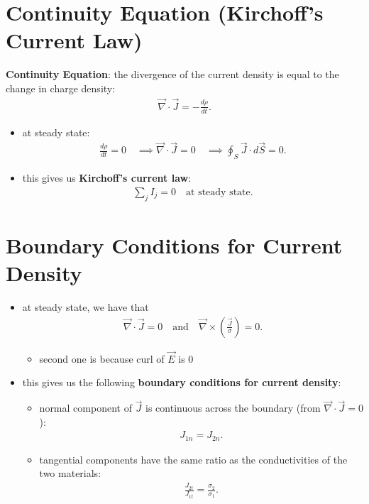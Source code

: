 \documentclass[10pt]{article}
\begin{document}
\section{Continuity Equation (Kirchoff's Current Law)}
\begin{theorem}
    \textbf{Continuity Equation}: the divergence of the current density is equal to the change in charge density: 
    \begin{gather*}
        \vec{\nabla } \cdot \vec{J} = - \frac{d\rho}{dt} 
    .\end{gather*}
\end{theorem}
\begin{itemize}
    \item at steady state: 
        \begin{gather*}
            \frac{d\rho }{dt} = 0 \quad \implies \vec{\nabla } \cdot \vec{J} =0 \quad \implies \oint_{S} \vec{J} \cdot d\vec{S} = 0  
        .\end{gather*}
    \item this gives us \textbf{Kirchoff's current law}:
        \begin{gather*}
            \sum_{j} I_j = 0 \quad \text{at steady state}
        .\end{gather*}
\end{itemize}

\section{Boundary Conditions for Current Density}
\begin{itemize}
    \item at steady state, we have that 
        \begin{gather*}
            \vec{\nabla } \cdot \vec{J} = 0 \quad \text{and} \quad \vec{\nabla } \times \left( \frac{\vec{J}}{\sigma} \right) = 0
        .\end{gather*}
        \begin{itemize}
            \item second one is because curl of $\vec{E} $ is 0
        \end{itemize}
    \item this gives us the following \textbf{boundary conditions for current density}:
        \begin{itemize}
            \item normal component of $\vec{J} $ is continuous across the boundary (from $\vec{\nabla } \cdot \vec{J} =0 $):
                \begin{gather*}
                    J_{1n} = J_{2n}
                .\end{gather*}
            \item tangential components have the same ratio as the conductivities of the two materials: 
                \begin{gather*}
                    \frac{J_{2t}}{J_{1t}} = \frac{\sigma_2}{\sigma_1}
                .\end{gather*}
        \end{itemize}
\end{itemize}
\end{document}

